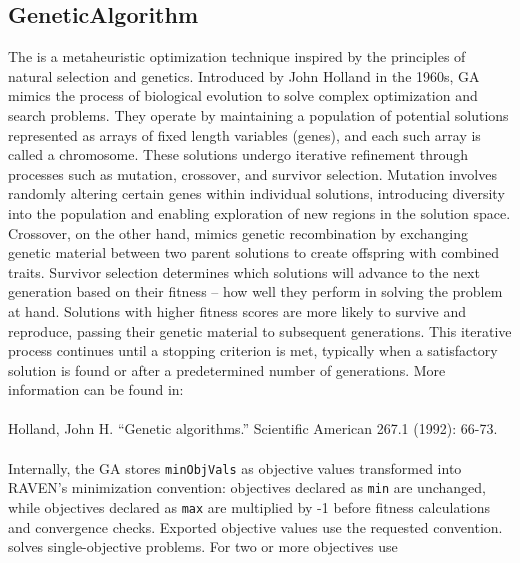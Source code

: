 \subsection{GeneticAlgorithm}
  The  is a metaheuristic optimization technique inspired by the
  principles                             of natural selection and genetics. Introduced by John
  Holland in the 1960s, GA mimics the process of                             biological evolution to
  solve complex optimization and search problems. They operate by maintaining a population of
  potential solutions represented as arrays of fixed length variables (genes), and each such array
  is called a chromosome.                             These solutions undergo iterative refinement
  through processes such as mutation, crossover, and survivor selection. Mutation involves randomly
  altering certain genes within                             individual solutions, introducing
  diversity into the population and enabling exploration of new regions in the solution space.
  Crossover, on the other hand, mimics genetic recombination by exchanging genetic material between
  two parent solutions to create                             offspring with combined traits.
  Survivor selection determines which solutions will advance to the next generation based on
  their fitness -- how well they perform in solving the problem at hand. Solutions with higher
  fitness scores are more likely to                             survive and reproduce, passing their
  genetic material to subsequent generations. This iterative process continues
  until a stopping criterion is met, typically when a satisfactory solution is found or after a
  predetermined number of generations.                             More information can be found
  in:\\\\                              Holland, John H. ``Genetic algorithms.'' Scientific American
  267.1 (1992): 66-73.\\\\                              Internally, the GA stores
  \texttt{minObjVals} as objective values transformed into RAVEN's minimization convention:
  objectives declared as \texttt{min} are unchanged, while objectives declared as \texttt{max} are
  multiplied by -1                             before fitness calculations and convergence checks.
  Exported objective values use the requested convention.\\
   solves single-objective problems. For two or more objectives use
